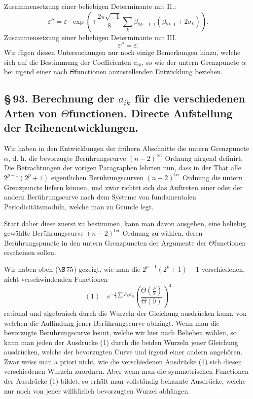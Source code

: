 \documentclass[10pt]{article}
\begin{document}
Zusammensetzung einer beliebigen Determinante mit II.:
\[
\varepsilon''=\varepsilon\cdot
\exp\!\left(\mp\frac{2\pi\sqrt{-1}}8\sum_k\beta_{2k-1,1}(\beta_{2k,1}+2\sigma_k)\right).
\]
Zusammensetzung einer beliebigen Determinante mit III.
\[
\varepsilon''=\varepsilon.
\]
Wir fügen diesen Untersuchungen nur noch einige Bemerkungen hinzu, welche sich auf die Bestimmung der Coefficienten \(a_{ik}\), so wie der untern Grenzpuncte \(\alpha\) bei irgend einer nach \(\Theta\)functionen anzustellenden Entwicklung beziehen.

\subsection*{\S\,93. Berechnung der \(a_{ik}\) für die verschiedenen Arten von \(\Theta\)functionen. Directe Aufstellung der Reihenentwicklungen.}

Wir haben in den Entwicklungen der frühern Abschnitte die untern Grenzpuncte \(\alpha\), d. h. die bevorzugte Berührungscurve \((n-2)^{\mathrm{ter}}\) Ordnung nirgend definirt. Die Betrachtungen der vorigen Paragraphen lehrten nun, dass in der That alle \(2^{p-1}(2^p+1)\) eigentlichen Berührungscurven \((n-2)^{\mathrm{ter}}\) Ordnung die untern Grenzpuncte liefern können, und zwar richtet sich das Auftreten einer oder der andern Berührungscurve nach dem Systeme von fundamentalen Periodicitätsmoduln, welche man zu Grunde legt.

Statt daher diese zuerst zu bestimmen, kann man davon ausgehen, eine beliebig gewählte Berührungscurve \((n-2)^{\mathrm{ter}}\) Ordnung zu wählen, deren Berührungspuncte in den untern Grenzpuncten der Argumente der \(\Theta\)functionen erscheinen sollen.

Wir haben oben (\(\S\,75\)) gezeigt, wie man die \(2^{p-1}(2^p+1)-1\) verschiedenen, nicht verschwindenden Functionen
\[
(1)\quad
e^{-\frac12\sum P_h\sigma_h}\left(\frac{\Theta\left(\frac P2\right)}{\Theta(0)}\right)^4
\]
rational und algebraisch durch die Wurzeln der Gleichung ausdrücken kann, von welchen die Auffindung jener Berührungscurve abhängt. Wenn man die bevorzugte Berührungscurve kennt, welche wir hier nach Belieben wählen, so kann man jeden der Ausdrücke (1) durch die beiden Wurzeln jener Gleichung ausdrücken, welche der bevorzugten Curve und irgend einer andern angehören. Zwar weiss man a priori nicht, wie die verschiedenen Ausdrücke (1) sich diesen verschiedenen Wurzeln zuordnen. Aber wenn man die symmetrischen Functionen der Ausdrücke (1) bildet, so erhält man vollständig bekannte Ausdrücke, welche nur noch von jener willkürlich bevorzugten Wurzel abhängen.
\end{document}
